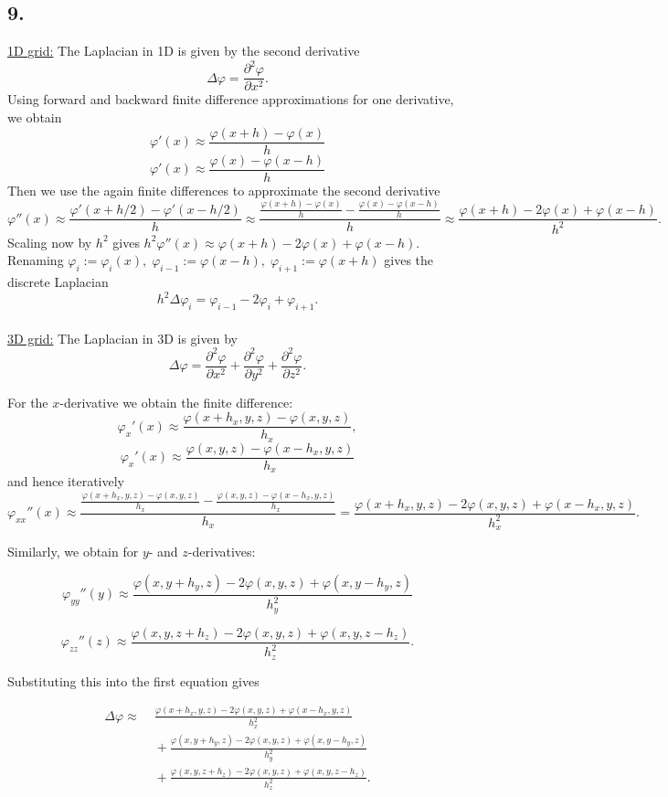 \subsection*{9.}
\underline{1D grid:} The Laplacian in 1D is given by the second derivative
\[
\Delta \varphi = \frac{\partial^2 \varphi}{\partial x^2}.
\]
Using forward and backward finite difference approximations for one derivative, we obtain
\[
\varphi'(x) \approx \frac{\varphi(x + h) - \varphi(x)}{h}
\]
\[
\varphi'(x) \approx \frac{\varphi(x) - \varphi(x - h)}{h}
\]
Then we use the again finite differences to approximate the second derivative
\[
\varphi''(x) \approx \frac{\varphi'(x + h/2) - \varphi'(x - h/2)}{h} \approx \frac{\frac{\varphi(x + h) - \varphi(x)}{h} - \frac{\varphi(x) - \varphi(x - h)}{h}}{h} \approx \frac{\varphi(x + h) - 2\varphi(x) + \varphi(x - h)}{h^2}.
\]
Scaling now by $h^2$ gives $h^2 \varphi''(x) \approx \varphi(x + h) - 2\varphi(x) + \varphi(x - h)$. Renaming $\varphi_i := \varphi_i(x), \; \varphi_{i - 1} := \varphi(x - h), \; \varphi_{i + 1} := \varphi(x + h)$ gives the discrete Laplacian
\[
h^2 \Delta \varphi_i = \varphi_{i - 1} - 2\varphi_i + \varphi_{i + 1}.
\]
\\

\underline{3D grid:}
The Laplacian in 3D is given by
\[
\Delta \varphi = \frac{\partial^2 \varphi}{\partial x^2} + \frac{\partial^2 \varphi}{\partial y^2} + \frac{\partial^2 \varphi}{\partial z^2}.
\]

For the \(x\)-derivative we obtain the finite difference:
\[
\varphi_x'(x) \approx \frac{\varphi(x + h_x, y, z) - \varphi(x, y, z)}{h_x},
\]
\[
\varphi_x'(x) \approx \frac{\varphi(x, y, z) - \varphi(x - h_x, y, z)}{h_x}
\]
and hence iteratively
\[
\varphi_{xx}''(x) \approx \frac{\frac{\varphi(x + h_x, y, z) - \varphi(x, y, z)}{h_x} - \frac{\varphi(x, y, z) - \varphi(x - h_x, y, z)}{h_x}}{h_x}
= \frac{\varphi(x + h_x, y, z) - 2\varphi(x, y, z) + \varphi(x - h_x, y, z)}{h_x^2}.
\]

Similarly, we obtain for \(y\)- and \(z\)-derivatives:

\[
\varphi_{yy}''(y) \approx \frac{\varphi(x, y + h_y, z) - 2\varphi(x, y, z) + \varphi(x, y - h_y, z)}{h_y^2}
\]

\[
\varphi_{zz}''(z) \approx \frac{\varphi(x, y, z + h_z) - 2\varphi(x, y, z) + \varphi(x, y, z - h_z)}{h_z^2}.
\]

Substituting this into the first equation gives

\begin{align*}
\Delta \varphi \approx & \; \frac{\varphi(x + h_x, y, z) - 2\varphi(x, y, z) + \varphi(x - h_x, y, z)}{h_x^2} \\
& \; + \frac{\varphi(x, y + h_y, z) - 2\varphi(x, y, z) + \varphi(x, y - h_y, z)}{h_y^2} \\
& \; + \frac{\varphi(x, y, z + h_z) - 2\varphi(x, y, z) + \varphi(x, y, z - h_z)}{h_z^2}.
\end{align*}

